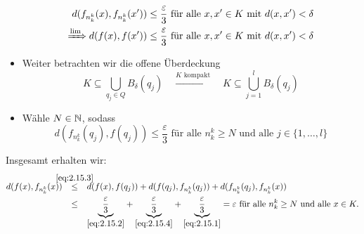 \begin{beweis}
\begin{itemize}
		\begin{align}
			d(f_{n_k^k}(x),f_{n_k^k}(x')) &\leq \frac{\varepsilon}{3} \text{ für alle } x,x' \in K \text{ mit } d(x,x') < \delta \label{eq:2.15.1} \\
			\xRightarrow{\lim} d(f(x),f(x')) &\leq \frac{\varepsilon}{3} \text{ für alle } x,x' \in K \text{ mit } d(x,x') < \delta \label{eq:2.15.2}
		\end{align}
		\item Weiter betrachten wir die offene Überdeckung
		\begin{equation}
			K \subseteq \bigcup_{q_j \in Q} B_\delta (q_j) \quad \xrightarrow{K \text{ kompakt}} \quad K \subseteq \bigcup_{j=1}^l B_\delta (q_j) \label{eq:2.15.3}
		\end{equation}
		\item Wähle $N \in \mathbb{N}$, sodass
		\begin{equation}
			d(f_{n_k^k}(q_j),f(q_j)) \leq \frac{\varepsilon}{3} \text{ für alle } n_k^k \geq N \text{ und alle } j \in \{1, \dots, l\} \label{eq:2.15.4}
		\end{equation}
	\end{itemize}
	Insgesamt erhalten wir:
	\begin{align*}
		d(f(x),f_{n_k^k}(x)) &\stack{\eqref{eq:2.15.3}}{\leq} d(f(x),f(q_j)) + d(f(q_j),f_{n_k^k}(q_j)) + d(f_{n_k^k}(q_j),f_{n_k^k}(x)) \\
		&\stack{}{\leq} \Underbrace{\frac{\varepsilon}{3}}{\eqref{eq:2.15.2}} + \Underbrace{\frac{\varepsilon}{3}}{\eqref{eq:2.15.4}} + \Underbrace{\frac{\varepsilon}{3}}{\eqref{eq:2.15.1}} = \varepsilon \text{ für alle } n_k^k \geq N \text{ und alle } x \in K.
	\end{align*}
\end{beweis}


